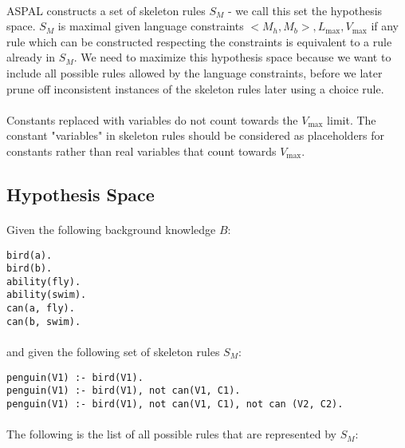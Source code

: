 \documentclass{article}
\theoremstyle{plain}
\theoremstyle{definition}
\begin{document}
\begin{multicols}{2}
\paragraph{} ASPAL constructs a set of skeleton rules $S_M$ - we call this set the hypothesis space. $S_M$ is maximal given language constraints $<M_h, M_b>, L_\text{max}, V_\text{max}$ if any rule which can be constructed respecting the constraints is equivalent to a rule already in $S_M$. We need to maximize this hypothesis space because we want to include all possible rules allowed by the language constraints, before we later prune off inconsistent instances of the skeleton rules later using a choice rule.

\paragraph{} Constants replaced with variables do not count towards the $V_\text{max}$ limit. \cite[p. 6]{lawnonmonotonic} The constant "variables" in skeleton rules should be considered as placeholders for constants rather than real variables that count towards $V_\text{max}$.

\subsection{Hypothesis Space}\label{sec:ASPALHypothesisSpace}

\paragraph{} Given the following background knowledge $B$:

\begin{lstlisting}
bird(a).
bird(b).
ability(fly).
ability(swim).
can(a, fly).
can(b, swim).
\end{lstlisting}

\paragraph{} and given the following set of skeleton rules $S_M$:

\begin{lstlisting}
penguin(V1) :- bird(V1).
penguin(V1) :- bird(V1), not can(V1, C1).
penguin(V1) :- bird(V1), not can(V1, C1), not can (V2, C2).
\end{lstlisting}

\paragraph{} The following is the list of all possible rules that are represented by $S_M$:


\end{multicols}
\end{document}

